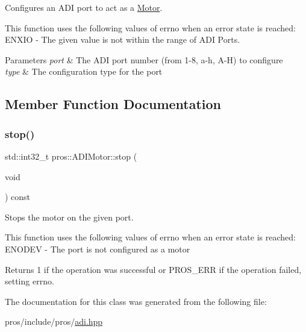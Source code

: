 Configures an A\+DI port to act as a \hyperlink{classpros_1_1Motor}{Motor}.

This function uses the following values of errno when an error state is reached\+: E\+N\+X\+IO -\/ The given value is not within the range of A\+DI Ports.


\begin{DoxyParams}{Parameters}
{\em port} & The A\+DI port number (from 1-\/8, \textquotesingle{}a\textquotesingle{}-\/\textquotesingle{}h\textquotesingle{}, \textquotesingle{}A\textquotesingle{}-\/\textquotesingle{}H\textquotesingle{}) to configure \\
\hline
{\em type} & The configuration type for the port \\
\hline
\end{DoxyParams}


\subsection{Member Function Documentation}
\mbox{\label{classpros_1_1ADIMotor_ad8e9be8dfbc022e893a4d15996fe3bcd}} 
\subsubsection{\texorpdfstring{stop()}{stop()}}
{\footnotesize\ttfamily std\+::int32\+\_\+t pros\+::\+A\+D\+I\+Motor\+::stop (\begin{DoxyParamCaption}\item[{void}]{ }\end{DoxyParamCaption}) const}

Stops the motor on the given port.

This function uses the following values of errno when an error state is reached\+: E\+N\+O\+D\+EV -\/ The port is not configured as a motor

\begin{DoxyReturn}{Returns}
1 if the operation was successful or P\+R\+O\+S\+\_\+\+E\+RR if the operation failed, setting errno. 
\end{DoxyReturn}


The documentation for this class was generated from the following file\+:\begin{DoxyCompactItemize}
\item 
pros/include/pros/\hyperlink{adi_8hpp}{adi.\+hpp}\end{DoxyCompactItemize}
